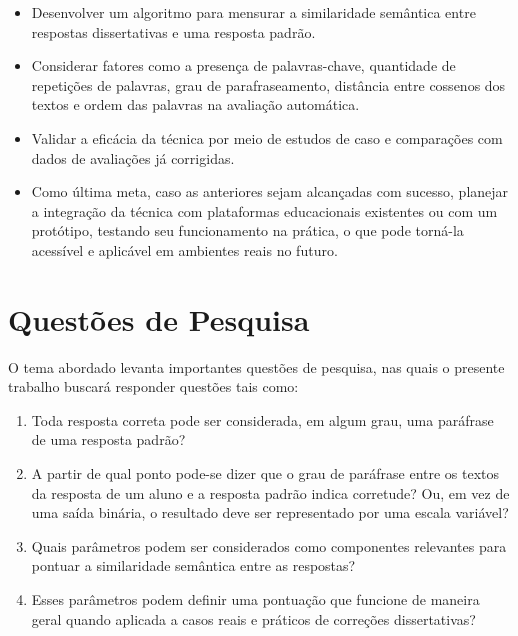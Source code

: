 \begin{itemize}
  \item Desenvolver um algoritmo para mensurar a similaridade semântica entre respostas dissertativas e uma resposta padrão.
  \item Considerar fatores como a presença de palavras-chave, quantidade de repetições de palavras, grau de parafraseamento, distância entre cossenos dos textos e ordem das palavras na avaliação automática.
  \item Validar a eficácia da técnica por meio de estudos de caso e comparações com dados de avaliações já corrigidas.
  \item Como última meta, caso as anteriores sejam alcançadas com sucesso, planejar a integração da técnica com plataformas educacionais existentes ou com um protótipo, testando seu funcionamento na prática, o que pode torná-la acessível e aplicável em ambientes reais no futuro.
\end{itemize}

\section{Questões de Pesquisa}

O tema abordado levanta importantes questões de pesquisa, nas quais o presente trabalho buscará responder questões tais como:

\begin{enumerate}
    \item Toda resposta correta pode ser considerada, em algum grau, uma paráfrase de uma resposta padrão?
    \item A partir de qual ponto pode-se dizer que o grau de paráfrase entre os textos da resposta de um aluno e a resposta padrão indica corretude? Ou, em vez de uma saída binária, o resultado deve ser representado por uma escala variável?
    \item Quais parâmetros podem ser considerados como componentes relevantes para pontuar a similaridade semântica entre as respostas?
    \item Esses parâmetros podem definir uma pontuação que funcione de maneira geral quando aplicada a casos reais e práticos de correções dissertativas?
\end{enumerate}


\newpage